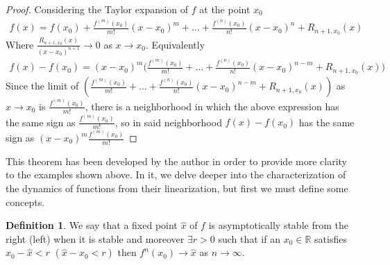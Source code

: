 \documentclass[12pt,a4paper]{report}
\theoremstyle{definition}
\newtheorem{definicion}{Definition}[section]
\begin{document}
\begin{proof}

Considering the Taylor expansion of $f$ at the point $x_0$
\begin{align*}
f(x) = f(x_0) + \frac{f^{(m)}(x_0)}{m!}(x - x_0)^m + \ldots 
+ \frac{f^{(n)}(x_0)}{n!}(x - x_0)^n 
+ R_{n+1,x_0}(x)
\end{align*}
%
Where $\frac{R_{n+1,x_0}(x)}{(x-x_0)^{n+1}} \to 0$ as $x \to x_0$. Equivalently
\begin{align*}
f(x) - f(x_0) = (x - x_0)^m \bigg( \frac{f^{(m)}(x_0)}{m!} + \ldots 
+ \frac{f^{(n)}(x_0)}{n!}(x - x_0)^{n-m} 
+ R_{n+1,x_0}(x) \bigg)
\end{align*}
%
Since the limit of 
$
\left( \frac{f^{(m)}(x_0)}{m!} +  \ldots 
+ \frac{f^{(n)}(x_0)}{n!}(x - x_0)^{n-m} +  R_{n+1,x_0}(x) \right)
$
%
as $x \to x_0$ is $\frac{f^{(m)}(x_0)}{m!}$, there is a neighborhood in which the above expression has the same sign as $\frac{f^{(m)}(x_0)}{m!}$, so in said neighborhood $f(x) - f(x_0)$ has the same sign as $(x - x_0)^m \frac{f^{(m)}(x_0)}{m!}$

\end{proof}

This theorem has been developed by the author in order to provide more clarity to the examples shown above. In it, we delve deeper into the characterization of the dynamics of functions from their linearization, but first we must define some concepts.

\begin{definicion}

We say that a fixed point $\hat{x}$ of $f$ is asymptotically stable from the right (left) when it is stable and moreover $\exists r > 0$ such that if an $x_0 \in \mathbb{R}$ satisfies $x_0 - \hat{x} < r$ $( \hat{x} - x_0 < r)$ then $f^n(x_0) \rightarrow \hat{x}$ as $n \rightarrow \infty$.

\end{definicion}    
\end{document}
